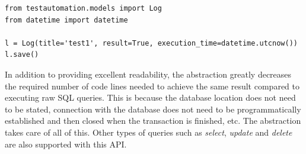 \vspace{4mm}
\noindent\begin{minipage}{\textwidth}
\begin{lstlisting}[caption=Database Communication Using Abstraction API, label={listing.db}, upquote=true]
from testautomation.models import Log
from datetime import datetime
 
l = Log(title='test1', result=True, execution_time=datetime.utcnow())
l.save()
\end{lstlisting}
\end{minipage}

In addition to providing excellent readability, the abstraction greatly decreases the required number of code lines needed to achieve the same result compared to executing raw SQL queries. This is because the database location does not need to be stated, connection with the database does not need to be programmatically established and then closed when the transaction is finished, etc. The abstraction takes care of all of this. Other types of queries such as \emph{select}, \emph{update} and \emph{delete} are also supported with this API.

